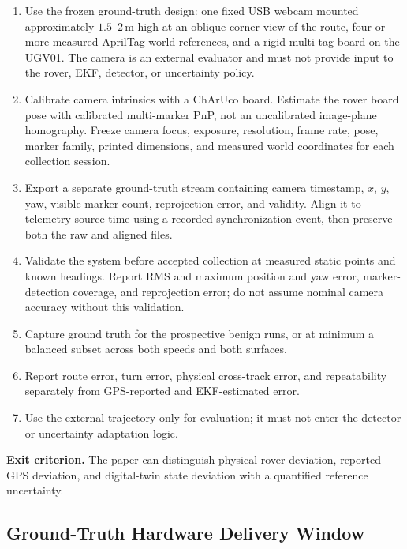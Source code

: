 \documentclass[11pt,a4paper]{article}
\begin{document}
\begin{enumerate}
    \item Use the frozen ground-truth design: one fixed USB webcam mounted
    approximately $1.5$--$2\,\mathrm{m}$ high at an oblique corner view of the
    route, four or more measured AprilTag world references, and a rigid
    multi-tag board on the UGV01. The camera is an external evaluator and must
    not provide input to the rover, EKF, detector, or uncertainty policy.

    \item Calibrate camera intrinsics with a ChArUco board. Estimate the rover
    board pose with calibrated multi-marker PnP, not an uncalibrated image-plane
    homography. Freeze camera focus, exposure, resolution, frame rate, pose,
    marker family, printed dimensions, and measured world coordinates for each
    collection session.

    \item Export a separate ground-truth stream containing camera timestamp,
    $x$, $y$, yaw, visible-marker count, reprojection error, and validity. Align
    it to telemetry source time using a recorded synchronization event, then
    preserve both the raw and aligned files.

    \item Validate the system before accepted collection at measured static
    points and known headings. Report RMS and maximum position and yaw error,
    marker-detection coverage, and reprojection error; do not assume nominal
    camera accuracy without this validation.

    \item Capture ground truth for the prospective benign runs, or at minimum
    a balanced subset across both speeds and both surfaces.

    \item Report route error, turn error, physical cross-track error, and
    repeatability separately from GPS-reported and EKF-estimated error.

    \item Use the external trajectory only for evaluation; it must not enter
    the detector or uncertainty adaptation logic.
\end{enumerate}

\textbf{Exit criterion.} The paper can distinguish physical rover deviation,
reported GPS deviation, and digital-twin state deviation with a quantified
reference uncertainty.

\subsection{Ground-Truth Hardware Delivery Window}
\end{document}
